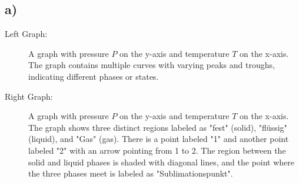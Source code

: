 

\subsection*{a)}

\begin{description}
    \item[Left Graph:] A graph with pressure \( P \) on the y-axis and temperature \( T \) on the x-axis. The graph contains multiple curves with varying peaks and troughs, indicating different phases or states.
    \item[Right Graph:] A graph with pressure \( P \) on the y-axis and temperature \( T \) on the x-axis. The graph shows three distinct regions labeled as "fest" (solid), "flüssig" (liquid), and "Gas" (gas). There is a point labeled "1" and another point labeled "2" with an arrow pointing from 1 to 2. The region between the solid and liquid phases is shaded with diagonal lines, and the point where the three phases meet is labeled as "Sublimationspunkt".
\end{description}